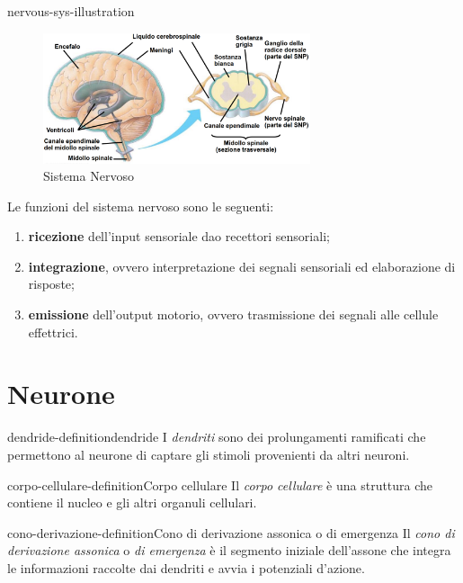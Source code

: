 \documentclass[preview]{standalone}
\begin{document}
\begin{snippet}{nervous-sys-illustration}
    \setlength{\intextsep}{0pt}%
    \begin{figure}
        \includegraphics[width=0.7\textwidth]{./resources/nervous_system.png}
        \caption{Sistema Nervoso}
        \vspace{-1cm}
    \end{figure}
    
    Le funzioni del sistema nervoso sono le seguenti:
    \begin{enumerate}
        \item \textbf{ricezione} dell'input sensoriale dao recettori sensoriali;
        \item \textbf{integrazione}, ovvero interpretazione dei segnali sensoriali ed elaborazione di risposte;
        \item \textbf{emissione} dell'output motorio, ovvero trasmissione dei segnali alle cellule effettrici.
    \end{enumerate}
    
    \wrapfill
\end{snippet}

\section{Neurone}

\begin{snippetdefinition}{dendride-definition}{dendride}
    I \textit{dendriti} sono dei prolungamenti ramificati che
    permettono al neurone di captare gli stimoli provenienti da altri
    neuroni.
\end{snippetdefinition}

\begin{snippetdefinition}{corpo-cellulare-definition}{Corpo cellulare}
    Il \textit{corpo cellulare} è una struttura che contiene
    il nucleo e gli altri organuli cellulari.
\end{snippetdefinition}

\begin{snippetdefinition}{cono-derivazione-definition}{Cono di derivazione assonica o di emergenza}
    Il \textit{cono di derivazione assonica} o \textit{di emergenza}    
    è il segmento iniziale dell'assone che integra le informazioni
    raccolte dai dendriti e avvia i potenziali d'azione.
\end{snippetdefinition}
\end{document}
